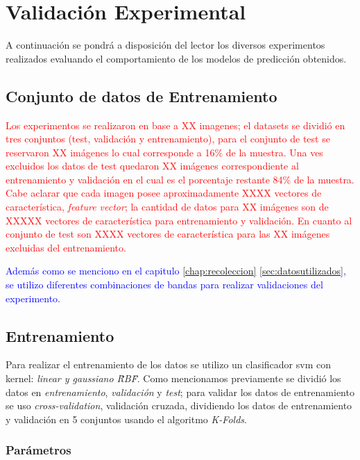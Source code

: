 \section{Validación Experimental}\label{validacion}

A continuación se pondrá a disposición del lector los diversos experimentos realizados evaluando el comportamiento de los modelos de predicción obtenidos.

\subsection*{Conjunto de datos de Entrenamiento}

\textcolor{red}{Los experimentos se realizaron en base a XX imagenes; el datasets se dividió en tres conjuntos (test, validación y entrenamiento), para el conjunto de test se reservaron XX imágenes lo cual corresponde a 16\% de la muestra. Una ves excluidos los datos de test quedaron XX imágenes correspondiente al entrenamiento y validación en el  cual es el porcentaje restante 84\% de la muestra.  Cabe aclarar que cada imagen posee aproximadamente XXXX vectores de  característica, \textit{feature vector}; la cantidad de datos  para XX imágenes son de XXXXX vectores de característica para entrenamiento y validación. En cuanto  al conjunto de test son XXXX vectores de característica para las XX imágenes excluidas del entrenamiento.}

\textcolor{blue}{Además como se menciono en el capitulo \ref{chap:recoleccion} \ref{sec:datosutilizados}, se utilizo diferentes combinaciones de bandas para realizar validaciones del experimento. }

\subsection{Entrenamiento}\label{sub:entrenamiento}

Para realizar el entrenamiento de los datos se utilizo un clasificador \ac{svm} con kernel: \textit{linear y gaussiano \"RBF\"}. Como mencionamos previamente se dividió los datos en \textit{entrenamiento}, \textit{validación} y \textit{test}; para validar los datos de entrenamiento se uso \textit{cross-validation}, validación cruzada, dividiendo los datos de entrenamiento y validación en 5 conjuntos usando el algoritmo \textit{K-Folds}. 


\subsubsection{Parámetros}\label{sub:parametros}


